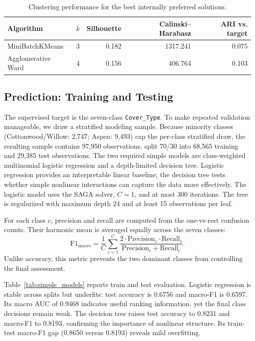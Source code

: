 \documentclass{article}
\begin{document}
\begin{table}[H]
  \centering
  \caption{Clustering performance for the best internally preferred solutions.}
  \label{tab:clustering}
  \small
  \begin{tabular}{lrrrr}
    \toprule
    Algorithm & $k$ & Silhouette & Calinski--Harabasz & ARI vs. target \\
    \midrule
    MiniBatchKMeans & 3 & 0.182 & 1317.241 & 0.075 \\
    Agglomerative Ward & 4 & 0.156 & 406.764 & 0.103 \\
    \bottomrule
  \end{tabular}
\end{table}

\FloatBarrier
\subsection{Prediction: Training and Testing}

The supervised target is the seven-class \texttt{Cover\_Type}. To make repeated validation manageable, we draw a stratified modeling sample. Because minority classes (Cottonwood/Willow: 2,747; Aspen: 9,493) cap the per-class stratified draw, the resulting sample contains 97,950 observations, split 70/30 into 68,565 training and 29,385 test observations. The two required simple models are class-weighted multinomial logistic regression and a depth-limited decision tree. Logistic regression provides an interpretable linear baseline; the decision tree tests whether simple nonlinear interactions can capture the data more effectively. The logistic model uses the SAGA solver, $C=1$, and at most 300 iterations. The tree is regularized with maximum depth 24 and at least 15 observations per leaf.

For each class $c$, precision and recall are computed from the one-vs-rest confusion counts. Their harmonic mean is averaged equally across the seven classes:
\begin{equation}
\text{F1}_{\text{macro}}=\frac{1}{C}\sum_{c=1}^{C}
\frac{2\cdot\text{Precision}_c\cdot\text{Recall}_c}
{\text{Precision}_c+\text{Recall}_c}.
\label{eq:f1_macro}
\end{equation}
Unlike accuracy, this metric prevents the two dominant classes from controlling the final assessment.

Table~\ref{tab:simple_models} reports train and test evaluation. Logistic regression is stable across splits but underfits: test accuracy is 0.6756 and macro-F1 is 0.6597. Its macro AUC of 0.9468 indicates useful ranking information, yet the final class decisions remain weak. The decision tree raises test accuracy to 0.8231 and macro-F1 to 0.8193, confirming the importance of nonlinear structure. Its train-test macro-F1 gap (0.8650 versus 0.8193) reveals mild overfitting.
\end{document}
